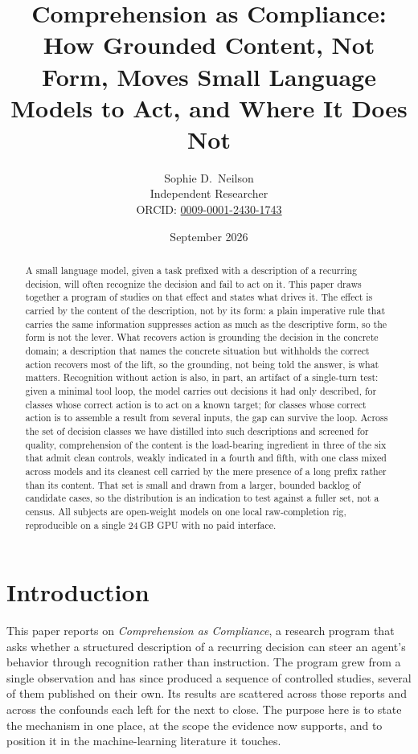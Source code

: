 \documentclass[11pt,a4paper]{article}
\title{%
  Comprehension as Compliance: \\
  How Grounded Content, Not Form, Moves Small Language Models to Act,
  and Where It Does Not%
}
\author{Sophie D.\ Neilson \\
  \small Independent Researcher \\
  \small ORCID: \href{https://orcid.org/0009-0001-2430-1743}{0009-0001-2430-1743}
}
\date{September 2026}
\begin{document}
\maketitle

\begin{abstract}
A small language model, given a task prefixed with a description of a recurring
decision, will often recognize the decision and fail to act on it. This paper draws
together a program of studies on that effect and states what drives it. The effect is
carried by the content of the description, not by its form: a plain imperative rule
that carries the same information suppresses action as much as the descriptive form, so
the form is not the lever. What recovers action
is grounding the decision in the concrete domain; a description that names the concrete
situation but withholds the correct action recovers most of the lift, so the
grounding, not being told the answer, is what matters. Recognition without action is
also, in part, an artifact of a single-turn test: given a minimal tool loop, the model
carries out decisions it had only described, for classes whose correct action is to act
on a known target; for classes whose correct action is to assemble a result from
several inputs, the gap can survive the loop. Across the set of decision classes we have
distilled into such descriptions and screened for quality, comprehension of the content
is the load-bearing ingredient in three of the six that admit clean controls, weakly
indicated in a fourth and fifth, with one class mixed across models and its cleanest cell carried by
the mere presence of a long prefix rather than its content. That set is
small and drawn from a larger, bounded backlog of candidate cases, so the distribution
is an indication to test against a fuller set, not a census. All subjects are
open-weight models on one local raw-completion rig, reproducible on a single 24\,GB GPU
with no paid interface.
\end{abstract}

\section{Introduction}

This paper reports on \emph{Comprehension as Compliance}, a research program
that asks whether a structured description of a recurring decision can steer an agent's
behavior through recognition rather than instruction. The program grew from a single
observation and has since produced a sequence of controlled studies, several of them
published on their own. Its results are scattered across those reports and across the
confounds each left for the next to close. The purpose here is to state the mechanism
in one place, at the scope the evidence now supports, and to position it in the
machine-learning literature it touches.
\end{document}
